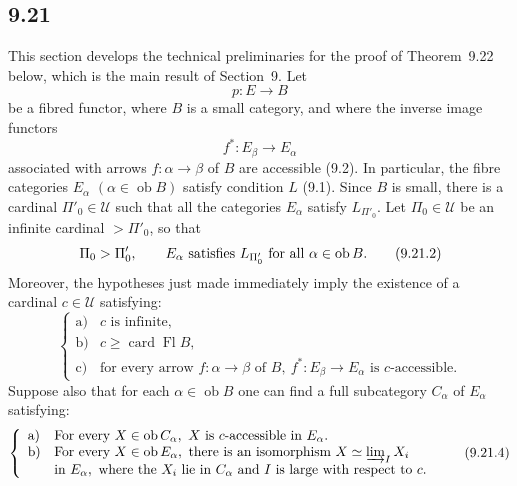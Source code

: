 \documentclass[11pt]{article}
\newcommand{\U}{\mathcal{U}}
\newcommand{\ob}{\operatorname{ob}}
\newcommand{\card}{\operatorname{card}}
\newcommand{\Fl}{\operatorname{Fl}}
\begin{document}
\subsection*{9.21}

This section develops the technical preliminaries for the proof of Theorem~9.22 below, which is the main result of Section~9. Let
\begin{equation}
 p:E\longrightarrow B
 \tag{9.21.1}
\end{equation}
be a fibred functor, where $B$ is a small category, and where the inverse image functors
\[
 f^\ast:E_\beta\longrightarrow E_\alpha
\]
associated with arrows $f:\alpha\to\beta$ of $B$ are accessible (9.2). In particular, the fibre categories $E_\alpha$ $(\alpha\in\ob B)$ satisfy condition $L$ (9.1). Since $B$ is small, there is a cardinal $\Pi'_0\in\U$ such that all the categories $E_\alpha$ satisfy $L_{\Pi'_0}$. Let $\Pi_0\in\U$ be an infinite cardinal $>\Pi'_0$, so that
\begin{equation}
 \Pi_0>\Pi'_0,\qquad E_\alpha\ \hbox{satisfies}\ L_{\Pi'_0}
 \ \hbox{for all}\ \alpha\in\ob B.
 \tag{9.21.2}
\end{equation}
Moreover, the hypotheses just made immediately imply the existence of a cardinal $c\in\U$ satisfying:
\begin{equation}
\left\{
\begin{array}{ll}
\text{a)} & c \text{ is infinite},\\
\text{b)} & c\geq \card\Fl B,\\
\text{c)} & \text{for every arrow }f:\alpha\to\beta\text{ of }B,\ 
f^\ast:E_\beta\to E_\alpha\text{ is }c\text{-accessible}.
\end{array}
\right.
\tag{9.21.3}
\end{equation}
Suppose also that for each $\alpha\in\ob B$ one can find a full subcategory $C_\alpha$ of $E_\alpha$ satisfying:
\begin{equation}
\left\{
\begin{array}{ll}
\text{a)} & \text{For every }X\in\ob C_\alpha,\ X\text{ is }c\text{-accessible in }E_\alpha.\\
\text{b)} & \text{For every }X\in\ob E_\alpha,\text{ there is an isomorphism }
X\simeq\varinjlim_I X_i\\
& \text{in }E_\alpha,\text{ where the }X_i\text{ lie in }C_\alpha
\text{ and }I\text{ is large with respect to }c.
\end{array}
\right.
\tag{9.21.4}
\end{equation}
\end{document}
